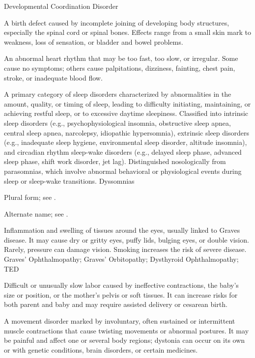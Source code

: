 \synonyms
Developmental Coordination Disorder

 A birth defect caused by incomplete joining of developing body structures, especially the spinal cord or spinal bones. Effects range from a small skin mark to weakness, loss of sensation, or bladder and bowel problems.

 An abnormal heart rhythm that may be too fast, too slow, or irregular. Some cause no symptoms; others cause palpitations, dizziness, fainting, chest pain, stroke, or inadequate blood flow.

 A primary category of sleep disorders characterized by abnormalities in the amount, quality, or timing of sleep, leading to difficulty initiating, maintaining, or achieving restful sleep, or to excessive daytime sleepiness. Classified into intrinsic sleep disorders (e.g., psychophysiological insomnia, obstructive sleep apnea, central sleep apnea, narcolepsy, idiopathic hypersomnia), extrinsic sleep disorders (e.g., inadequate sleep hygiene, environmental sleep disorder, altitude insomnia), and circadian rhythm sleep-wake disorders (e.g., delayed sleep phase, advanced sleep phase, shift work disorder, jet lag). Distinguished nosologically from parasomnias, which involve abnormal behavioral or physiological events during sleep or sleep-wake transitions.
\synonyms
Dyssomnias

 Plural form; see .

 Alternate name; see .

 Inflammation and swelling of tissues around the eyes, usually linked to Graves disease. It may cause dry or gritty eyes, puffy lids, bulging eyes, or double vision. Rarely, pressure can damage vision. Smoking increases the risk of severe disease.
\synonyms
Graves' Ophthalmopathy; Graves' Orbitopathy; Dysthyroid Ophthalmopathy; TED


 Difficult or unusually slow labor caused by ineffective contractions, the baby’s size or position, or the mother’s pelvis or soft tissues. It can increase risks for both parent and baby and may require assisted delivery or cesarean birth.

 A movement disorder marked by involuntary, often sustained or intermittent muscle contractions that cause twisting movements or abnormal postures. It may be painful and affect one or several body regions; dystonia can occur on its own or with genetic conditions, brain disorders, or certain medicines.



